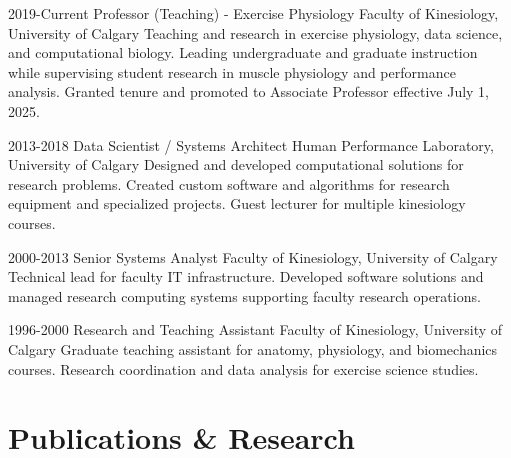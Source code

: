 \documentclass[]{friggeri-cv}
\begin{document}
\begin{entrylist}
\entry
{2019-Current}
{Professor (Teaching) - Exercise Physiology}
{Faculty of Kinesiology, University of Calgary}
{Teaching and research in exercise physiology, data science, and computational biology. Leading undergraduate and graduate instruction while supervising student research in muscle physiology and performance analysis. Granted tenure and promoted to Associate Professor effective July 1, 2025.}

\entry
{2013-2018}
{Data Scientist / Systems Architect}
{Human Performance Laboratory, University of Calgary}
{Designed and developed computational solutions for research problems. Created custom software and algorithms for research equipment and specialized projects. Guest lecturer for multiple kinesiology courses.}

\entry
{2000-2013}
{Senior Systems Analyst}
{Faculty of Kinesiology, University of Calgary}
{Technical lead for faculty IT infrastructure. Developed software solutions and managed research computing systems supporting faculty research operations.}

\entry
{1996-2000}
{Research and Teaching Assistant}
{Faculty of Kinesiology, University of Calgary}
{Graduate teaching assistant for anatomy, physiology, and biomechanics courses. Research coordination and data analysis for exercise science studies.}
\end{entrylist}


\section{Publications \& Research}
\begin{refsection}
     \nocite{*}
  \printbibliography[type=article, title={{\color{UC_gold}Pub}lished Journal Articles}, notkeyword={submitted}, heading= subbibliography]
  \printbibliography[type=book, title ={{\color{UC_gold}Boo}ks / Book Chapters}, heading= subbibliography]
     
      \end{refsection}
\begin{refsection}
  \nocite{*}
  \printbibliography[type=inproceedings, title={{\color{UC_gold}Con}ference Presentations / Published Abstracts}, keyword={presentation},  heading=subbibliography]
 \end{refsection}
\end{document}
